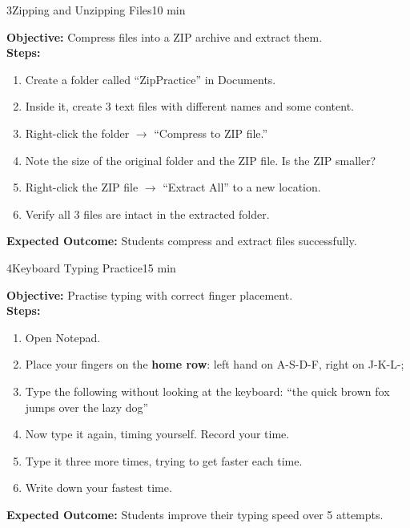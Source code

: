 \begin{labactivity}{3}{Zipping and Unzipping Files}{10 min}

\textbf{Objective:} Compress files into a ZIP archive and extract them.\\[4pt]
\textbf{Steps:}
\begin{enumerate}[label=\protect\stepcircle{\arabic*}, leftmargin=2cm, itemsep=4pt]
  \item Create a folder called ``ZipPractice'' in Documents.
  \item Inside it, create 3 text files with different names and some content.
  \item Right-click the folder $\rightarrow$ ``Compress to ZIP file.''
  \item Note the size of the original folder and the ZIP file. Is the ZIP smaller?
  \item Right-click the ZIP file $\rightarrow$ ``Extract All'' to a new location.
  \item Verify all 3 files are intact in the extracted folder.
\end{enumerate}
\textbf{Expected Outcome:} Students compress and extract files successfully.
\welldone
\end{labactivity}

\begin{labactivity}{4}{Keyboard Typing Practice}{15 min}

\textbf{Objective:} Practise typing with correct finger placement.\\[4pt]
\textbf{Steps:}
\begin{enumerate}[label=\protect\stepcircle{\arabic*}, leftmargin=2cm, itemsep=4pt]
  \item Open Notepad.
  \item Place your fingers on the \textbf{home row}: left hand on A-S-D-F, right on J-K-L-;
  \item Type the following without looking at the keyboard: ``the quick brown fox jumps over the lazy dog''
  \item Now type it again, timing yourself. Record your time.
  \item Type it three more times, trying to get faster each time.
  \item Write down your fastest time.
\end{enumerate}
\textbf{Expected Outcome:} Students improve their typing speed over 5 attempts.
\welldone
\end{labactivity}

